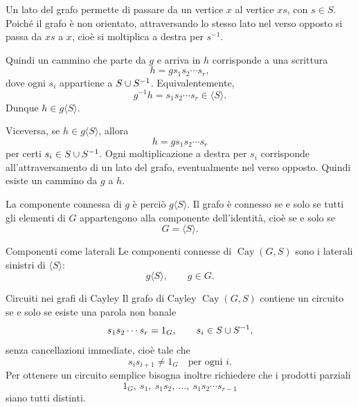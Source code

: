 \documentclass[a4paper]{article}
\begin{document}
\begin{snippetproof}{}
    Un lato del grafo permette di passare da un vertice \(x\) al vertice \(xs\), con \(s\in S\). Poiché il grafo è non orientato, attraversando lo stesso lato nel verso opposto si passa da \(xs\) a \(x\), cioè si moltiplica a destra per \(s^{-1}\).

    Quindi un cammino che parte da \(g\) e arriva in \(h\) corrisponde a una scrittura
    \[
        h=g s_1s_2\cdots s_r,
    \]
    dove ogni \(s_i\) appartiene a \(S\cup S^{-1}\). Equivalentemente,
    \[
        g^{-1}h=s_1s_2\cdots s_r\in \langle S\rangle.
    \]
    Dunque \(h\in g\langle S\rangle\).

    Viceversa, se \(h\in g\langle S\rangle\), allora
    \[
        h=g s_1s_2\cdots s_r
    \]
    per certi \(s_i\in S\cup S^{-1}\). Ogni moltiplicazione a destra per \(s_i\) corrisponde all'attraversamento di un lato del grafo, eventualmente nel verso opposto. Quindi esiste un cammino da \(g\) a \(h\).

    La componente connessa di \(g\) è perciò \(g\langle S\rangle\). Il grafo è connesso se e solo se tutti gli elementi di \(G\) appartengono alla componente dell'identità, cioè se e solo se
    \[
        G=\langle S\rangle.
    \]
\end{snippetproof}

\begin{snippetcorollary}{Componenti come laterali}
    Le componenti connesse di \(\operatorname{Cay}(G,S)\) sono i laterali sinistri di \(\langle S\rangle\):
    \[
        g\langle S\rangle,
        \qquad g\in G.
    \]
\end{snippetcorollary}

\begin{snippetproposition}{Circuiti nei grafi di Cayley}
    Il grafo di Cayley \(\operatorname{Cay}(G,S)\) contiene un circuito se e solo se esiste una parola non banale
    \[
        s_1s_2\cdots s_r=1_G,
        \qquad
        s_i\in S\cup S^{-1},
    \]
    senza cancellazioni immediate, cioè tale che
    \[
        s_i s_{i+1}\neq 1_G
        \quad
        \text{per ogni } i.
    \]
    Per ottenere un circuito semplice bisogna inoltre richiedere che i prodotti parziali
    \[
        1_G,\ s_1,\ s_1s_2,\ \ldots,\ s_1s_2\cdots s_{r-1}
    \]
    siano tutti distinti.
\end{snippetproposition}
\end{document}
